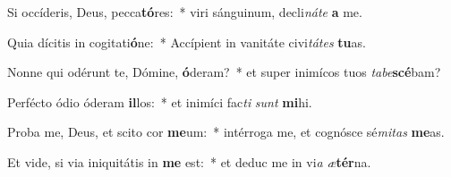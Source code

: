 \item Si occíderis, Deus, pecca\textbf{tó}res:~* viri sánguinum, decli\textit{ná}\textit{te} \textbf{a} me.
\item Quia dícitis in cogitati\textbf{ó}ne:~* Accípient in vanitáte civi\textit{tá}\textit{tes} \textbf{tu}as.
\item Nonne qui odérunt te, Dómine, \textbf{ó}deram?~* et super inimícos tuos \textit{ta}\textit{be}\textbf{scé}bam?
\item Perfécto ódio óderam \textbf{il}los:~* et inimíci fac\textit{ti} \textit{sunt} \textbf{mi}hi.
\item Proba me, Deus, et scito cor \textbf{me}um:~* intérroga me, et cognósce sé\textit{mi}\textit{tas} \textbf{me}as.
\item Et vide, si via iniquitátis in \textbf{me} est:~* et deduc me in vi\textit{a} \textit{æ}\textbf{tér}na.
